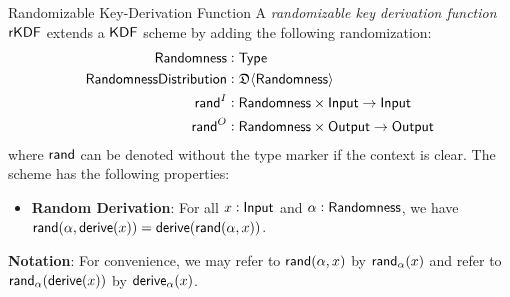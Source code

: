 \begin{definitiontoc}{Randomizable Key-Derivation Function}
    A \emph{randomizable key derivation function} ${\textsf{rKDF}}$ extends a ${\textsf{KDF}}$ scheme by adding the following randomization:
    \begin{align*}
        {\textsf{Randomness}}             &: {\textsf{Type}} \\
        {\textsf{RandomnessDistribution}} &: \mathfrak{D}\langle{{\textsf{Randomness}}}\rangle \\
        {\textsf{rand}}^I                 &: {\textsf{Randomness}} \times {\textsf{Input}} \to {\textsf{Input}} \\
        {\textsf{rand}}^O                 &: {\textsf{Randomness}} \times {\textsf{Output}} \to {\textsf{Output}}
    \end{align*}
    where ${\textsf{rand}}$ can be denoted without the type marker if the context is clear. The scheme has the following properties:
    \begin{itemize}
        \item \textbf{Random Derivation}: For all $x : {\textsf{Input}}$ and $\alpha : {\textsf{Randomness}}$, we have ${\textsf{rand}}(\alpha, {\textsf{derive}}(x)) = {\textsf{derive}}({\textsf{rand}}(\alpha, x))$.
    \end{itemize}

    \textbf{Notation}: For convenience, we may refer to ${\textsf{rand}}(\alpha, x)$ by ${\textsf{rand}}_\alpha(x)$ and refer to ${\textsf{rand}}_\alpha({\textsf{derive}}(x))$ by ${\textsf{derive}}_\alpha(x)$.
\end{definitiontoc}

